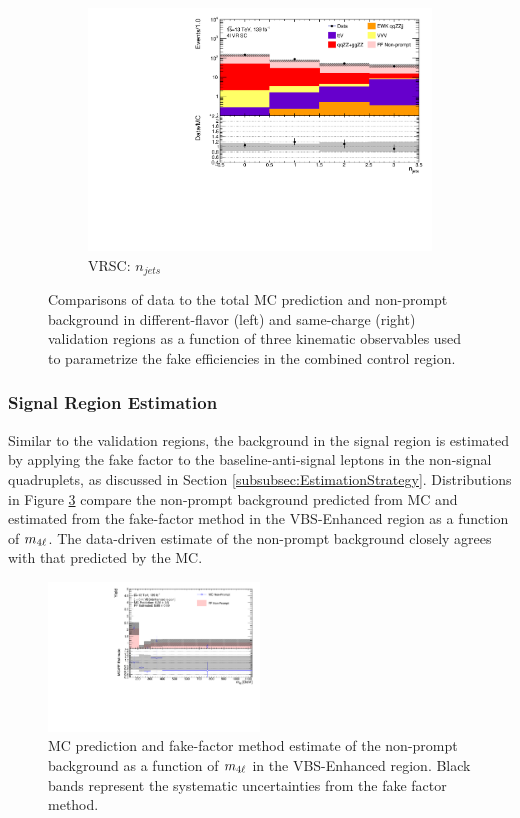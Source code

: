 \begin{figure}[!htbp]
\begin{subfigure}{.49\textwidth}
        \includegraphics[width = 0.85\linewidth]{figures/Analysis/Background/Overlay_VRSC_FFApplied_n_jets.pdf}
        \caption{VRSC: $n_{jets}$ \label{fig:AllDataMCYield_VRSC_njet}}
    \end{subfigure}
        \caption{ Comparisons of data to the total MC prediction and non-prompt background in different-flavor (left) and same-charge (right) validation regions as a function of three kinematic observables used to parametrize the fake efficiencies in the combined control region.\label{fig:AllDataMCYield}}
\end{figure}
\newpage
\subsubsection{Signal Region Estimation}
\label{subsubsec:SREstimation}
Similar to the validation regions, the background in the signal region is estimated by applying the fake factor to the baseline-anti-signal leptons in the non-signal quadruplets, as discussed in Section \ref{subsubsec:EstimationStrategy}. Distributions in Figure \ref{fig:MCFFRedComparison} compare the non-prompt background predicted from MC and estimated from the fake-factor method in the VBS-Enhanced region as a function of $m_{4\ell}$. The data-driven estimate of the non-prompt background closely agrees with that predicted by the MC.

\begin{figure}[!htbp]
    \centering
    \includegraphics[width=0.5\textwidth]{figures/Analysis/Background/MCRedCompare_VBS_Enhanced_M4l.pdf}
    \caption{ MC prediction and fake-factor method estimate of the non-prompt background as a function of $m_{4\ell}$ in the VBS-Enhanced region. Black bands represent the systematic uncertainties from the fake factor method. \label{fig:MCFFRedComparison}}
\end{figure}

